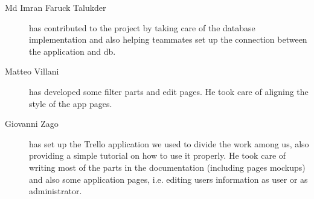 \begin{description}
    \item[Md Imran Faruck Talukder] has contributed to the project by taking care of the database implementation and also helping teammates set up the connection between the application and db.
    \item[Matteo Villani] has developed some filter parts and edit pages. He took care of aligning the style of the app pages.
    \item[Giovanni Zago] has set up the Trello application we used to divide the work among us, also providing a simple tutorial on how to use it properly. He took care of writing most of the parts in the documentation (including pages mockups) and also some application pages, i.e. editing users information as user or as administrator.
\end{description}
